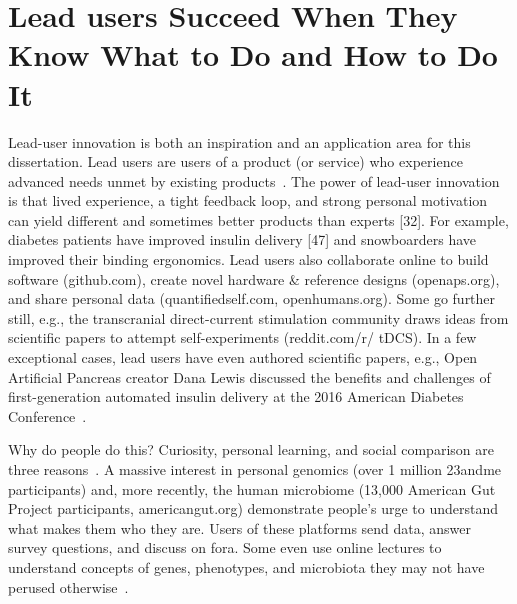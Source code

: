\section{Lead users Succeed When They Know What to Do and How to Do It}


Lead-user innovation is both an inspiration and an application area for this dissertation. Lead users are
users of a product (or service) who experience advanced needs unmet by existing products~\cite{VonHippel2005}. The
power of lead-user innovation is that lived experience, a tight feedback loop, and strong personal
motivation can yield different and sometimes better products than experts [32]. For example, diabetes
patients have improved insulin delivery [47] and snowboarders have improved their binding
ergonomics. Lead users also collaborate online to build software
(github.com), create novel hardware \& reference designs
(openaps.org), and share personal data (quantifiedself.com,
openhumans.org). Some go further still, e.g., the transcranial
direct-current stimulation community draws ideas from scientific
papers to attempt self-experiments (reddit.com/r/
tDCS). In a few exceptional cases, lead users have even authored
scientific papers, e.g., Open Artificial Pancreas creator
Dana Lewis discussed the benefits and challenges of first-generation
automated insulin delivery at the 2016 American
Diabetes Conference~\cite{DanaLewis}.

Why do people do this? Curiosity, personal learning, and social
comparison are three reasons~\cite{Reinecke2015}. A massive interest in
personal genomics (over 1 million 23andme participants)
and, more recently, the human microbiome (13,000 American
Gut Project participants, americangut.org) demonstrate
people’s urge to understand what makes them who they are.
Users of these platforms send data, answer survey questions,
and discuss on fora. Some even use online lectures to understand
concepts of genes, phenotypes, and microbiota they
may not have perused otherwise~\cite{23andMe2017, Knight2016}. 

